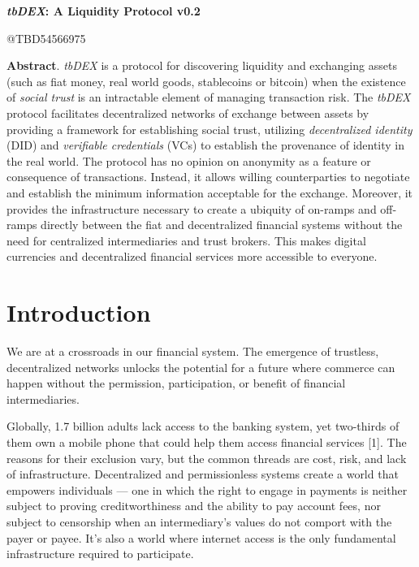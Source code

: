 \documentclass[11pt]{article}
\begin{document}
\begin{center}
{\LARGE \textbf{\textit{tbDEX}: A Liquidity Protocol v0.2}}
\end{center}


\vspace{1\baselineskip}
\begin{center}
{\large \textcolor[HTML]{999999}{@TBD54566975}}
\end{center}


\vspace{2\baselineskip}
\textbf{Abstract}. \textit{tbDEX} is a protocol for discovering liquidity and exchanging assets (such as fiat money, real world goods, stablecoins or bitcoin)\textcolor[HTML]{202124}{ }when the existence of \textit{social trust} is an intractable element of managing transaction risk. The \textit{tbDEX} protocol facilitates decentralized networks of exchange between assets by providing a framework for establishing social trust, utilizing \textit{decentralized identity} (DID) and \textit{verifiable credentials }(VCs) to establish the provenance of identity in the real world. The protocol has no opinion on anonymity as a feature or consequence of transactions. Instead, it allows willing counterparties to negotiate and establish the minimum information acceptable for the exchange. Moreover, it provides the infrastructure necessary to create a ubiquity of on-ramps and off-ramps directly between the fiat and decentralized financial systems without the need for centralized intermediaries and trust brokers. This makes digital currencies and decentralized financial services more accessible to everyone.

\vspace{1\baselineskip}
\section{Introduction}

\vspace{1\baselineskip}
We are at a crossroads in our financial system. The emergence of trustless, decentralized networks unlocks the potential for a future where commerce can happen without the permission, participation, or benefit of financial intermediaries. 

\vspace{1\baselineskip}
Globally, 1.7 billion adults lack access to the banking system, yet two-thirds of them own a mobile phone that could help them access financial services [1]. The reasons for their exclusion vary, but the common threads are cost, risk, and lack of infrastructure. Decentralized and permissionless systems create a world that empowers individuals \textcolor[HTML]{202124}{— one in which }the right to engage in payments is neither subject to proving creditworthiness and the ability to pay account fees, nor subject to censorship when an intermediary’s values do not comport with the payer or payee. It’s also a world where internet access is the only fundamental infrastructure required to participate.\ \ 
\end{document}
